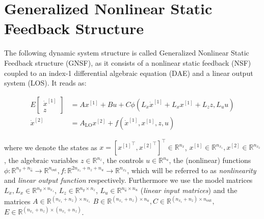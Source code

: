 \documentclass{report}
\newcommand {\matr}[2]{\left[\begin{array}{#1}#2\end{array}\right]}
\newcommand{\R}{{\mathbb{R}}}
\newcommand{\uind}[1]{^{[#1]}}
\newcommand{\defI}[1]{\textit{#1}}
\newcommand{\nxone}{{n_{x_1}}}
\newcommand{\nxtwo}{{n_{x_2}}}
\newcommand{\nx}{\ensuremath{n_x}}
\newcommand{\nz}{{n_{z}}}
\newcommand{\nout}{n_{\text{out}}}
\newcommand{\ninx}{n_{y}}
\newcommand{\ninu}{n_{\hat{u}}}
\begin{document}
\chapter*{Generalized Nonlinear Static Feedback Structure}
\newcommand{\axdot}{E_{11}}
\newcommand{\ax}{A_{1}}
\newcommand{\au}{B_{1}}
\newcommand{\aphi}{C_{1}}
\newcommand{\az}{E_{12}}
\newcommand{\bx}{A_{2}}
\newcommand{\bu}{B_{2}}
\newcommand{\bg}{C_{2}}
\newcommand{\bz}{E_{22}}
\newcommand{\bxdot}{E_{21}}
\newcommand{\lo}{A_{\text{LO}}}
\newcommand{\lx}{L_x}
\newcommand{\lxdot}{L_{\dot{x}}}
\newcommand{\lu}{L_u}
\newcommand{\lz}{L_z}

The following dynamic system structure is called Generalized Nonlinear Static Feedback structure (GNSF), as it consists of a nonlinear static feedback (NSF) coupled to an index-1 differential algebraic equation (DAE) and a linear output system (LOS). It reads as:

\begin{align*}
E \matr{c}{\dot{x}\uind{1} \\ z} & = A x\uind{1} + B u + C \phi(\lxdot\dot{x}\uind{1}+ \lx x\uind{1} + \lz z, \lu u)  	\\
\dot{x}\uind{2} &= \lo x\uind{2} + f(\dot{x}\uind{1}, x\uind{1}, z,u) 
\end{align*}

where we denote the states as $ x = \left[ {x\uind{1}}^\top, {x\uind{2}}^\top\right]^\top \in \R^{\nx} $, $ x\uind{1} \in \R^\nxone, x\uind{2}\in\R^\nxtwo $, the algebraic variables $ z \in \R^\nz $, the controls $ u \in \R^{n_u} $, the (nonlinear) functions $ \phi: \R^{\ninx + \ninu} \rightarrow \R^{\nout}, f: \R^{2\nxone + \nz + n_u} \rightarrow \R^{\nxtwo} $, which will be referred to as \defI{nonlinearity} and \defI{linear output function} respectively. Furthermore we use the model matrices $ \lxdot,\lx \in \R^{\ninx \times \nxone} $, $ \lz \in \R^{\ninx \times \nz} $, $ \lu \in \R^{\ninu \times n_u} $ (\defI{linear input matrices}) and the matrices $ A\in \R^{(\nxone + \nz) \times \nxone}$  $ B \in \R^{(\nxone + \nz) \times n_u},
C \in \R^{(\nxone + \nz) \times \nout},$  $E \in \R^{(\nxone + \nz) \times (\nxone + \nz)} $.
\end{document}
